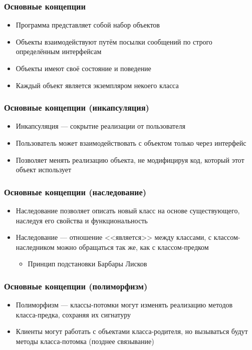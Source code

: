 \documentclass{../../slides-style}
\begin{document}
    \begin{frame}
        \frametitle{Основные концепции}
        \begin{itemize}
            \item Программа представляет собой набор объектов
            \item Объекты взаимодействуют путём посылки сообщений по строго определённым интерфейсам
            \item Объекты имеют своё состояние и поведение
            \item Каждый объект является экземпляром некоего класса
        \end{itemize}
    \end{frame}

    \begin{frame}
        \frametitle{Основные концепции (инкапсуляция)}
        \begin{itemize}
            \item Инкапсуляция --- сокрытие реализации от пользователя
            \item Пользователь может взаимодействовать с объектом только через интерфейс
            \item Позволяет менять реализацию объекта, не модифицируя код, который этот объект использует
        \end{itemize}
    \end{frame}

    \begin{frame}
        \frametitle{Основные концепции (наследование)}
        \begin{itemize}
            \item Наследование позволяет описать новый класс на основе существующего, наследуя его свойства и функциональность
            \item Наследование --- отношение <<является>> между классами, с классом-наследником можно обращаться так же, как с классом-предком
            \begin{itemize}
                \item Принцип подстановки Барбары Лисков
            \end{itemize}
        \end{itemize}
    \end{frame}

    \begin{frame}
        \frametitle{Основные концепции (полиморфизм)}
        \begin{itemize}
            \item Полиморфизм --- классы-потомки могут изменять реализацию методов класса-предка, сохраняя их сигнатуру
            \item Клиенты могут работать с объектами класса-родителя, но вызываться будут методы класса-потомка (позднее связывание)
        \end{itemize}
    \end{frame}
\end{document}
